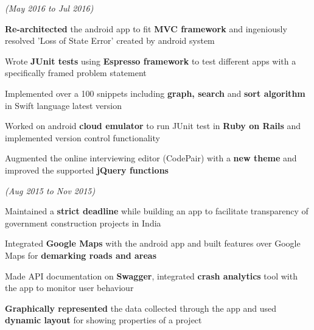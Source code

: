 \documentclass[a4paper]{deedy-resume} %
\begin{document}
\hfill {\textit{\small(May 2016 to Jul 2016)}}\\

\begin{tightitemize}
\item \textbf{Re-architected} the android app to fit \textbf{MVC framework} and ingeniously resolved 'Loss of State Error' created by android system
\item Wrote \textbf{JUnit tests} using \textbf{Espresso framework} to test different apps with a specifically framed problem statement
\item Implemented over a 100 snippets including  \textbf{ graph, search} and \textbf{sort algorithm} in Swift language latest version
\item Worked on android \textbf{cloud emulator} to run JUnit test in \textbf{Ruby on Rails} and implemented version control functionality
\item Augmented the online interviewing editor (CodePair) with a \textbf{new theme} and improved the supported \textbf{jQuery functions}
\end{tightitemize}
\microspace

\hfill {\textit{\small(Aug 2015 to Nov 2015)}}\


\begin{tightitemize}
\item Maintained a  \textbf{strict deadline} while building an app to facilitate transparency of government construction projects in India
\item Integrated \textbf{Google Maps} with the android app and built features over Google Maps for \textbf{demarking roads and areas}
\item Made API documentation on \textbf{Swagger}, integrated \textbf{crash analytics} tool with the app to monitor user behaviour
\item \textbf{Graphically represented} the data collected through the app and used \textbf{dynamic layout} for showing properties of a project
\end{tightitemize}
\microspace





\end{document}

